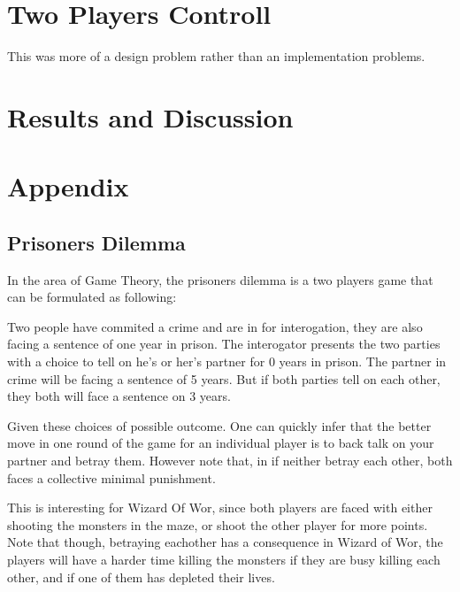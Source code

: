 \documentclass{article}
\begin{document}
  \section{Two Players Controll}
  This was more of a design problem rather than an implementation problems.
  \section{Results and Discussion}

  \section{Appendix}
  \subsection{Prisoners Dilemma}

  In the area of Game Theory, the prisoners dilemma is a two players game that can be formulated as following:

  Two people have commited a crime and are in for interogation, they are also facing a sentence of one year in prison. The interogator presents the two parties with a choice to tell on he's or her's partner for 0 years in prison. The partner in crime will be facing a sentence of 5 years. But if both parties tell on each other, they both will face a sentence on 3 years.

  Given these choices of possible outcome. One can quickly infer that the better move in one round of the game for an individual player is to back talk on your partner and betray them. However note that, in if neither betray each other, both faces a collective minimal punishment.

  This is interesting for Wizard Of Wor, since both players are faced with either shooting the monsters in the maze, or shoot the other player for more points. Note that though, betraying eachother has a consequence in Wizard of Wor, the players will have a harder time killing the monsters if they are busy killing each other, and if one of them has depleted their lives.
\end{document}
